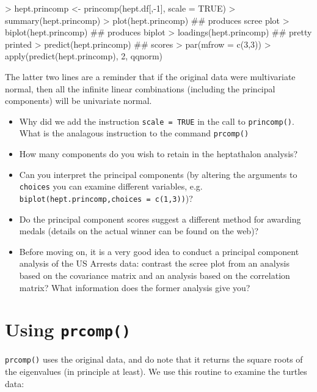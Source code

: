\documentclass[11pt]{article}
\begin{document}
\begin{Schunk}
\begin{Sinput}
> hept.princomp <- princomp(hept.df[,-1], scale = TRUE)
> summary(hept.princomp)
> plot(hept.princomp) ## produces scree plot
> biplot(hept.princomp) ## produces biplot
> loadings(hept.princomp) ## pretty printed 
> predict(hept.princomp) ## scores
> par(mfrow = c(3,3))
> apply(predict(hept.princomp), 2, qqnorm)
\end{Sinput}
\end{Schunk}

The latter two lines are a reminder that if the original data were multivariate normal, then all the infinite linear combinations (including the principal components) will be univariate normal.

\begin{itemize}
\item Why did we add the instruction \verb+scale = TRUE+ in the call to \verb+princomp()+.   What is the analagous instruction to the command \verb+prcomp()+
\item How many components do you wish to retain in the heptathalon analysis?
\item Can you interpret the principal components (by altering the arguments to \verb+choices+ you can examine different variables, e.g.  \verb+biplot(hept.princomp,choices = c(1,3))+)?
\item Do the principal component scores suggest a different method for awarding medals (details on the actual winner can be found on the web)?
\end{itemize}


\begin{itemize}
\item Before moving on, it is a very good idea to conduct a principal component analysis of the US Arrests data: contrast the scree plot from an analysis based on the covariance matrix and an analysis based on the correlation matrix?   What information does the former analysis give you?
\end{itemize}


\section{Using \texttt{prcomp()}}

\texttt{prcomp()} uses the original data, and do note that it returns the square roots of the eigenvalues (in principle at least).   We use this routine to examine the turtles data:
\end{document}
